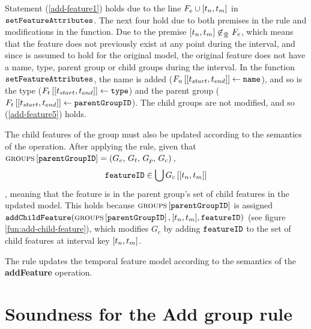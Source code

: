 Statement (\ref{add-feature1}) holds due to the line $F_e \cup \interval{t_n}{t_m}$ in $\texttt{setFeatureAttributes}$. The next four hold due to both premises in the rule and modifications in the function. Due to the premise $\interval{t_n}{t_m} \not \innr F_e$, which means that the feature does not previously exist at any point during the interval, and since  is assumed to hold for the original model, the original feature does not have a name, type, parent group or child groups during the interval. In the function $\texttt{setFeatureAttributes}$, the name is added ($\lookup{F_n}{\interval{t_{start}}{t_{end}}} \assign \var{name}$), and so is the type ($\lookup{F_t}{\interval{t_{start}}{t_{end}}} \assign \var{type}$) and the parent group ($\lookup{F_t}{\interval{t_{start}}{t_{end}}} \assign \var{parentGroupID}$). The child groups are not modified, and so (\ref{add-feature5}) holds.

The child features of the group must also be updated according to the semantics of the operation. After applying the rule, given that $\textsc{groups}{} \left[ \texttt{parentGroupID} \right] = \left(G_e,\, G_t,\, G_p,\, G_c\right){}$, 
\[
   \var{featureID} \in \bigcup \lookup{G_c}{\interval{t_n}{t_m}}
\]
, meaning that the feature is in the parent group's set of child features in the updated model. This holds because $\textsc{groups}{} \left[ \texttt{parentGroupID} \right]$ is assigned $\var{addChildFeature}(\lookup{\groups}{\var{parentGroupID}}, \interval{t_n}{t_m}, \var{featureID})$ (see figure \vref{fun:add-child-feature}), which modifies $G_c$ by adding $\texttt{featureID}$ to the set of child features at interval key $\interval{t_n}{t_m}$.
\\

\begin{lemma}
   The  rule updates the temporal feature model according to the semantics of the \textbf{addFeature} operation.
   \label{lemma:add-feature-mod}
\end{lemma}

\section{Soundness for the Add group rule}
\label{sec:soundness-for-the-add-group-rule}

